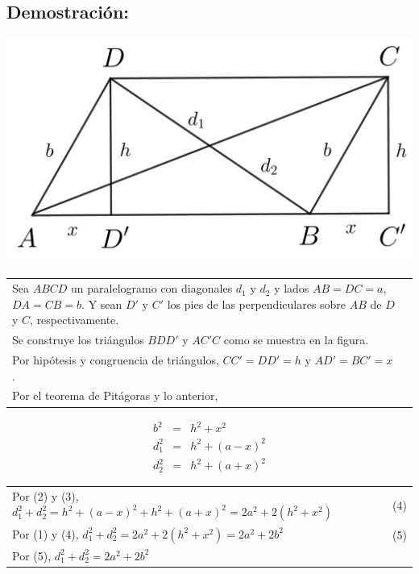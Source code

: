 \documentclass[12pt,a4paper]{article}
\begin{document}
\subsection*{Demostración:}
\begin{center}
\includegraphics[scale=0.7]{Imagenes/paralelogramo.png} 
\end{center}
\begin{tabular}{p{15.9 cm} p{1cm}}
Sea $ABCD$ un paralelogramo con diagonales $d_1$ y $d_2$ y lados $AB=DC=a$, $DA=CB=b$. Y sean $D'$ y $C'$ los pies de las perpendiculares sobre $AB$ de $D$ y $C$, respectivamente.
\\Se construye los triángulos $BDD'$ y $AC'C$ como se muestra en la figura.
\\Por hipótesis y congruencia de triángulos, $CC'=DD'=h$ y $AD'=BC'=x$.
\\Por el teorema de Pitágoras y lo anterior, 
\end{tabular}
\begin{eqnarray}
b^2&=& h^2 +x^2 \\
d_1^2 &=&h^2 +(a-x)^2\\
d_2^2&=&h^2 +(a+x)^2
\end{eqnarray}
\begin{tabular}{p{15.9 cm} p{1cm}}
Por (2) y (3), $d_1^2 +d_2^2=h^2 +(a-x)^2+h^2 +(a+x)^2=2a^2+2(h^2+x^2)$ &(4)
\\Por (1) y (4), $d_1^2 +d_2^2=2a^2+2(h^2+x^2)=2a^2+2b^2$ & (5)
\\Por (5), $d_1^2 +d_2^2=2a^2+2b^2$
\end{tabular}
\end{document}
